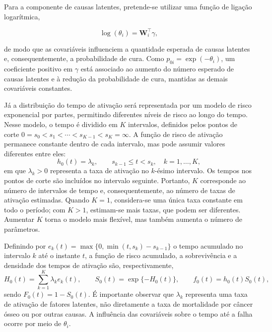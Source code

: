 \documentclass[11pt,a4paper]{article}
\begin{document}
Para a componente de causas latentes, pretende-se utilizar uma função de ligação logarítmica,

$$
\log(\theta_i)=\bm W_i^\top\gamma,
$$

\noindent de modo que as covariáveis influenciem a quantidade esperada de causas latentes e, consequentemente, a probabilidade de cura. Como $p_{0i}=\exp(-\theta_i)$, um coeficiente positivo em $\gamma$ está associado ao aumento do número esperado de causas latentes e à redução da probabilidade de cura, mantidas as demais covariáveis constantes.

Já a distribuição do tempo de ativação será representada por um modelo de risco exponencial por partes, permitindo diferentes níveis de risco ao longo do tempo. Nesse modelo, o tempo é dividido em $K$ intervalos, definidos pelos pontos de corte $0=s_0<s_1<\cdots<s_{K-1}<s_K=\infty$. A função de risco de ativação permanece constante dentro de cada intervalo, mas pode assumir valores diferentes entre eles:
\begin{equation}
h_0(t)=\lambda_k,\qquad s_{k-1}\leq t<s_k,\quad k=1,\ldots,K,
\end{equation}
\noindent em que $\lambda_k>0$ representa a taxa de ativação no $k$-ésimo intervalo. Os tempos nos pontos de corte são incluídos no intervalo seguinte. Portanto, $K$ corresponde ao número de intervalos de tempo e, consequentemente, ao número de taxas de ativação estimadas. Quando $K=1$, considera-se uma única taxa constante em todo o período; com $K>1$, estimam-se mais taxas, que podem ser diferentes. Aumentar $K$ torna o modelo mais flexível, mas também aumenta o número de parâmetros.

Definindo por $e_k(t)=\max\{0,\min(t,s_k)-s_{k-1}\}$ o tempo acumulado no intervalo $k$ até o instante $t$, a função de risco acumulado, a sobrevivência e a densidade dos tempos de ativação são, respectivamente,
\begin{equation}
H_0(t)=\sum_{k=1}^{K}\lambda_k e_k(t),\qquad
S_0(t)=\exp\{-H_0(t)\},\qquad
f_0(t)=h_0(t)S_0(t),
\end{equation}
\noindent sendo $F_0(t)=1-S_0(t)$. É importante observar que $\lambda_k$ representa uma taxa de ativação de fatores latentes, não diretamente a taxa de mortalidade por câncer ósseo ou por outras causas. A influência das covariáveis sobre o tempo até a falha ocorre por meio de $\theta_i$.
\end{document}
